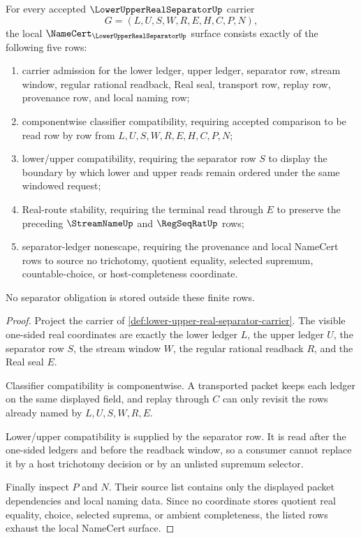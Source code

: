 \begin{theorem}
\label{thm:lower-upper-real-separator-namecert-obligations}
For every accepted $\LowerUpperRealSeparatorUp$ carrier
$$
G=(L,U,S,W,R,E,H,C,P,N),
$$
the local $\NameCert_{\LowerUpperRealSeparatorUp}$ surface consists exactly of the following five rows:
\begin{enumerate}
\item carrier admission for the lower ledger, upper ledger, separator row, stream window, regular rational readback, Real seal, transport row, replay row, provenance row, and local naming row;
\item componentwise classifier compatibility, requiring accepted comparison to be read row by row from $L,U,S,W,R,E,H,C,P,N$;
\item lower/upper compatibility, requiring the separator row $S$ to display the boundary by which lower and upper reads remain ordered under the same windowed request;
\item Real-route stability, requiring the terminal read through $E$ to preserve the preceding $\StreamNameUp$ and $\RegSeqRatUp$ rows;
\item separator-ledger nonescape, requiring the provenance and local NameCert rows to source no trichotomy, quotient equality, selected supremum, countable-choice, or host-completeness coordinate.
\end{enumerate}
No separator obligation is stored outside these finite rows.
\end{theorem}
\begin{proof}
Project the carrier of \autoref{def:lower-upper-real-separator-carrier}. The visible one-sided real coordinates are exactly the lower ledger $L$, the upper ledger $U$, the separator row $S$, the stream window $W$, the regular rational readback $R$, and the Real seal $E$.

Classifier compatibility is componentwise. A transported packet keeps each ledger on the same displayed field, and replay through $C$ can only revisit the rows already named by $L,U,S,W,R,E$.

Lower/upper compatibility is supplied by the separator row. It is read after the one-sided ledgers and before the readback window, so a consumer cannot replace it by a host trichotomy decision or by an unlisted supremum selector.

Finally inspect $P$ and $N$. Their source list contains only the displayed packet dependencies and local naming data. Since no coordinate stores quotient real equality, choice, selected suprema, or ambient completeness, the listed rows exhaust the local NameCert surface.
\end{proof}

